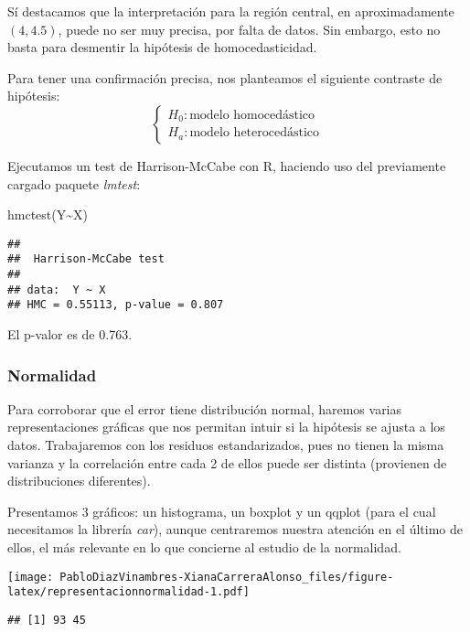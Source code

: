 \documentclass[
]{article}
\newenvironment{Shaded}{\begin{snugshade}}{\end{snugshade}}
\newcommand{\FunctionTok}[1]{\textcolor[rgb]{0.00,0.00,0.00}{#1}}
\newcommand{\NormalTok}[1]{#1}
\newcommand{\SpecialCharTok}[1]{\textcolor[rgb]{0.00,0.00,0.00}{#1}}
\begin{document}
Sí destacamos que la interpretación para la región central, en
aproximadamente \((4, 4.5)\), puede no ser muy precisa, por falta de
datos. Sin embargo, esto no basta para desmentir la hipótesis de
homocedasticidad.

Para tener una confirmación precisa, nos planteamos el siguiente
contraste de hipótesis: \[
\begin{cases}
H_0: \text{modelo homocedástico}\\
H_a: \text{modelo heterocedástico}
\end{cases}
\]

Ejecutamos un test de Harrison-McCabe con R, haciendo uso del
previamente cargado paquete \emph{lmtest}:

\begin{Shaded}
\begin{Highlighting}[]
\FunctionTok{hmctest}\NormalTok{(Y}\SpecialCharTok{\textasciitilde{}}\NormalTok{X)}
\end{Highlighting}
\end{Shaded}

\begin{verbatim}
## 
##  Harrison-McCabe test
## 
## data:  Y ~ X
## HMC = 0.55113, p-value = 0.807
\end{verbatim}

El p-valor es de 0.763.

\hypertarget{normalidad}{%
\subsubsection{Normalidad}\label{normalidad}}

Para corroborar que el error tiene distribución normal, haremos varias
representaciones gráficas que nos permitan intuir si la hipótesis se
ajusta a los datos. Trabajaremos con los residuos estandarizados, pues
no tienen la misma varianza y la correlación entre cada 2 de ellos puede
ser distinta (provienen de distribuciones diferentes).

Presentamos 3 gráficos: un histograma, un boxplot y un qqplot (para el
cual necesitamos la librería \emph{car}), aunque centraremos nuestra
atención en el último de ellos, el más relevante en lo que concierne al
estudio de la normalidad.

\texttt{[image: PabloDiazVinambres-XianaCarreraAlonso\_files/figure-latex/representacionnormalidad-1.pdf]}

\begin{verbatim}
## [1] 93 45
\end{verbatim}
\end{document}
